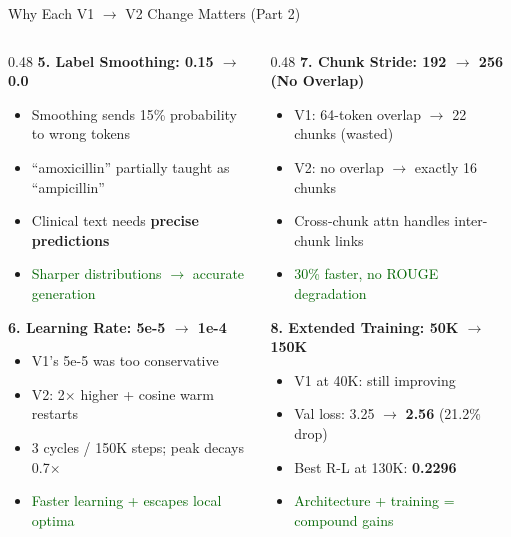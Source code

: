 \documentclass[10pt, aspectratio=169]{beamer}
\begin{document}
\begin{frame}{Why Each V1 $\rightarrow$ V2 Change Matters (Part 2)}
  \footnotesize
  \begin{columns}[T]
    \begin{column}{0.48\textwidth}
      \textbf{5. Label Smoothing: 0.15 $\rightarrow$ 0.0}
      \begin{itemize}\setlength{\itemsep}{0pt}
        \item Smoothing sends 15\% probability to wrong tokens
        \item ``amoxicillin'' partially taught as ``ampicillin''
        \item Clinical text needs \textbf{precise predictions}
        \item \textcolor{darkgreen}{Sharper distributions $\rightarrow$ accurate generation}
      \end{itemize}

      \vspace{0.05cm}
      \textbf{6. Learning Rate: 5e-5 $\rightarrow$ 1e-4}
      \begin{itemize}\setlength{\itemsep}{0pt}
        \item V1's 5e-5 was too conservative
        \item V2: 2$\times$ higher + cosine warm restarts
        \item 3 cycles / 150K steps; peak decays 0.7$\times$
        \item \textcolor{darkgreen}{Faster learning + escapes local optima}
      \end{itemize}
    \end{column}
    \begin{column}{0.48\textwidth}
      \textbf{7. Chunk Stride: 192 $\rightarrow$ 256 (No Overlap)}
      \begin{itemize}\setlength{\itemsep}{0pt}
        \item V1: 64-token overlap $\rightarrow$ 22 chunks (wasted)
        \item V2: no overlap $\rightarrow$ exactly 16 chunks
        \item Cross-chunk attn handles inter-chunk links
        \item \textcolor{darkgreen}{30\% faster, no ROUGE degradation}
      \end{itemize}

      \vspace{0.05cm}
      \textbf{8. Extended Training: 50K $\rightarrow$ 150K}
      \begin{itemize}\setlength{\itemsep}{0pt}
        \item V1 at 40K: still improving
        \item Val loss: 3.25 $\rightarrow$ \textbf{2.56} (21.2\% drop)
        \item Best R-L at 130K: \textbf{0.2296}
        \item \textcolor{darkgreen}{Architecture + training = compound gains}
      \end{itemize}
    \end{column}
  \end{columns}
\end{frame}
\end{document}
